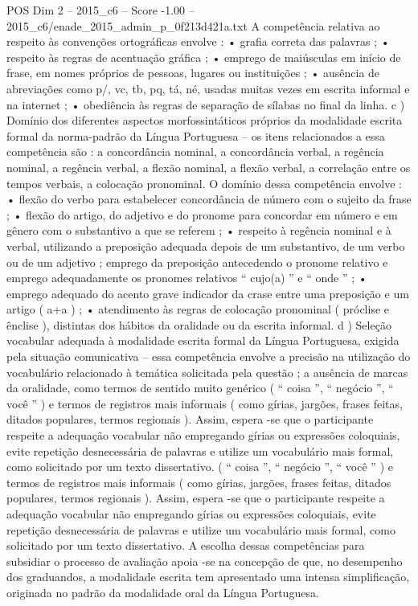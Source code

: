 \begin{textsample}{POS Dim 2 – 2015\_c6 – Score -1.00 – 2015\_c6/enade\_2015\_admin\_p\_0f213d421a.txt}
A competência relativa ao respeito às convenções ortográficas envolve : • grafia correta das palavras ; • respeito às regras de acentuação gráfica ; • emprego de maiúsculas em início de frase, em nomes próprios de pessoas, lugares ou instituições ; • ausência de abreviações como p/, vc, tb, pq, tá, né, usadas muitas vezes em escrita informal e na internet ; • obediência às regras de separação de sílabas no final da linha. c ) Domínio dos diferentes aspectos morfossintáticos próprios da modalidade escrita formal da norma-padrão da Língua Portuguesa – os itens relacionados a essa competência são : a concordância nominal, a concordância verbal, a regência nominal, a regência verbal, a flexão nominal, a flexão verbal, a correlação entre os tempos verbais, a colocação pronominal.
O domínio dessa competência envolve : • flexão do verbo para estabelecer concordância de número com o sujeito da frase ; • flexão do artigo, do adjetivo e do pronome para concordar em número e em gênero com o substantivo a que se referem ; • respeito à regência nominal e à verbal, utilizando a preposição adequada depois de um substantivo, de um verbo ou de um adjetivo ; emprego da preposição antecedendo o pronome relativo e emprego adequadamente os pronomes relativos “ cujo(a) ” e “ onde ” ; • emprego adequado do acento grave indicador da crase entre uma preposição e um artigo ( a+a ) ; • atendimento às regras de colocação pronominal ( próclise e ênclise ), distintas dos hábitos da oralidade ou da escrita informal. d ) Seleção vocabular adequada à modalidade escrita formal da Língua Portuguesa, exigida pela situação comunicativa – essa competência envolve a precisão na utilização do vocabulário relacionado à temática solicitada pela questão ; a ausência de marcas da oralidade, como termos de sentido muito genérico ( “ coisa ”, “ negócio ”, “ você ” ) e termos de registros mais informais ( como gírias, jargões, frases feitas, ditados populares, termos regionais ).
Assim, espera -se que o participante respeite a adequação vocabular não empregando gírias ou expressões coloquiais, evite repetição desnecessária de palavras e utilize um vocabulário mais formal, como solicitado por um texto dissertativo. ( “ coisa ”, “ negócio ”, “ você ” ) e termos de registros mais informais ( como gírias, jargões, frases feitas, ditados populares, termos regionais ).
Assim, espera -se que o participante respeite a adequação vocabular não empregando gírias ou expressões coloquiais, evite repetição desnecessária de palavras e utilize um vocabulário mais formal, como solicitado por um texto dissertativo.
A escolha dessas competências para subsidiar o processo de avaliação apoia -se na concepção de que, no desempenho dos graduandos, a modalidade escrita tem apresentado uma intensa simplificação, originada no padrão da modalidade oral da Língua Portuguesa.

\end{textsample}
